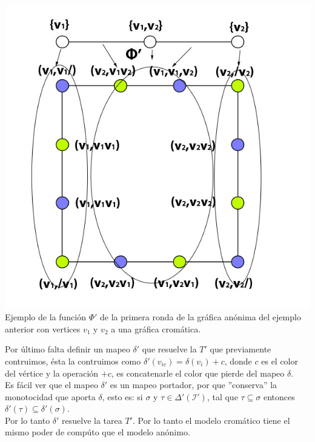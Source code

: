 \documentclass{article}
\begin{document}
\begin{enumerate}
{    \begin{center}
      \includegraphics[scale=0.4]{5_Delta.jpg}
      \\Ejemplo de la función $\Phi'$ de la primera ronda de la gráfica anónima del ejemplo anterior con vertices $v_1$ y $v_2$ a una gráfica cromática.
    \end{center}

    Por último falta definir un mapeo $\delta'$ que resuelve la $T'$ que previamente contruimos, ésta la contruimos como 
    $\delta'(v_{ic}) = \delta(v_{i}) +  c$, donde $c$ es el color del vértice y la operación $+ c$, es concatenarle el color que pierde
    del mapeo $\delta$.\\
    Es fácil ver que el mapeo $\delta'$ es un mapeo portador, por que ''conserva'' la monotocidad que aporta $\delta$, esto es:
    si $\sigma$ y $ \tau \in \Delta'(\mathcal{I}')$, tal que $\tau \subseteq \sigma$ entonces $\delta'(\tau) \subseteq \delta'(\sigma)$.\\

    Por lo tanto $\delta'$ resuelve la tarea $T'$. Por lo tanto el modelo cromático tiene el mismo poder de compúto que el modelo anónimo. 
  }
\end{enumerate}
\end{document}
